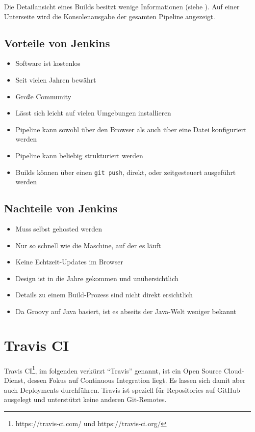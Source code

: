 Die Detailansicht eines Builds besitzt wenige Informationen (siehe ). Auf einer Unterseite wird die Konsolenausgabe der gesamten Pipeline angezeigt.

\subsection*{Vorteile von Jenkins}

\begin{itemize}
  \item Software ist kostenlos
  \item Seit vielen Jahren bewährt
  \item Große Community
  \item Lässt sich leicht auf vielen Umgebungen installieren
  \item Pipeline kann sowohl über den Browser als auch über eine Datei konfiguriert werden
  \item Pipeline kann beliebig strukturiert werden
  \item Builds können über einen \texttt{git push}, direkt, oder zeitgesteuert ausgeführt werden
\end{itemize}

\subsection*{Nachteile von Jenkins}

\begin{itemize}
  \item Muss selbst gehosted werden
  \item Nur so schnell wie die Maschine, auf der es läuft
  \item Keine Echtzeit-Updates im Browser
  \item Design ist in die Jahre gekommen und unübersichtlich
  \item Details zu einem Build-Prozess sind nicht direkt ersichtlich
  \item Da Groovy auf Java basiert, ist es abseits der Java-Welt weniger bekannt
\end{itemize}

\section{Travis CI}
\label{sec:analyse-travis}

Travis CI\footnote{https://travis-ci.com/ und https://travis-ci.org/}, im folgenden verkürzt ``Travis'' genannt, ist ein Open Source Cloud-Dienst, dessen Fokus auf Continuous Integration liegt. Es lassen sich damit aber auch Deployments durchführen. Travis ist speziell für Repositories auf GitHub ausgelegt und unterstützt keine anderen Git-Remotes.

